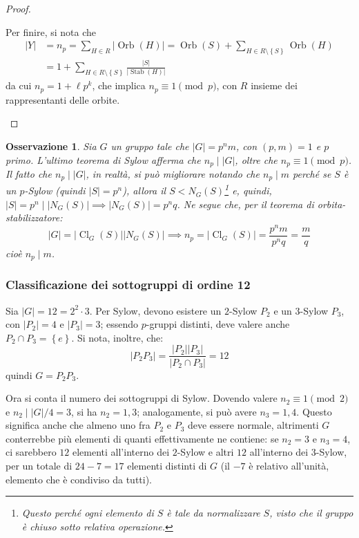 \documentclass[12pt]{scrartcl}
\theoremstyle{style}
\newtheorem{osservazione}{Osservazione}[section]
\numberwithin{equation}{subsection}
\begin{document}
\begin{proof}
\begin{enumerate}[(a).]
				Per finire, si nota che
				\[
					\begin{split}
						\lvert Y \rvert &=n_p = \sum_{H \in R}^{} \lvert \operatorname{Orb} (H) \rvert = \operatorname{Orb} (S) + \sum_{H \in R \setminus\left\{ S \right\} }^{} \operatorname{Orb} (H) \\
								&= 1 + \sum_{H \in R \setminus\left\{ S \right\} }^{} \frac{\lvert S \rvert }{\lvert \operatorname{Stab} (H) \rvert }
					\end{split}
				\] 
				da cui $n_p = 1 + \ell p^k$, che implica $n_p \equiv 1 \pmod{p} $, con $R$ insieme dei rappresentanti delle orbite.
		\end{enumerate}
	\end{proof}
\begin{osservazione}
Sia $G$ un gruppo tale che $\lvert G \rvert =p^n m $, con $(p,m)= 1$ e $p$ primo. L'ultimo teorema di Sylow afferma che $n_p  \mid \lvert G \rvert$, oltre che $n_p \equiv 1 \pmod{p} $.
Il fatto che $n_p  \mid |G|$, in realt\`a, si pu\`o migliorare notando che $n_p  \mid  m$ perch\'e se $S$ \`e un $p$-Sylow (quindi $\lvert S \rvert =p^n$), allora il $S < N_G(S)$\footnote{Questo perch\'e ogni elemento di $S$ \`e tale da normalizzare $S$, visto che il gruppo \`e chiuso sotto relativa operazione.} e, quindi, $\lvert S \rvert = p^n  \mid \lvert N_G(S) \rvert \implies \lvert N_G(S) \rvert = p^n q$.
Ne segue che, per il teorema di orbita-stabilizzatore:
\[
\lvert G \rvert  = \lvert \operatorname{Cl} _G(S)  \rvert \lvert N_G(S) \rvert \implies n_p = \lvert \operatorname{Cl} _G(S) \rvert = \frac{p^n m}{p^n q} = \frac{m}{q}
\] 
cio\`e $n_p  \mid m$.
\end{osservazione}
\subsubsection{Classificazione dei sottogruppi di ordine 12}
	Sia $\lvert G \rvert = 12 = 2^2 \cdot 3$. 
	Per Sylow, devono esistere un $2$-Sylow $P_2$ e un $3$-Sylow $P_3$, con $\lvert P_2 \rvert =4$ e $\lvert P_3 \rvert =3$; essendo $p$-gruppi distinti, deve valere anche $P_2\cap P_3 = \left\{ e \right\} $.
	Si nota, inoltre, che:
	\[
	\lvert P_2P_3 \rvert = \frac{\lvert P_2 \rvert \lvert P_3 \rvert }{\lvert P_2 \cap P_3\rvert} = 12
	\] 
	quindi $G = P_2P_3$.
	
	Ora si conta il numero dei sottogruppi di Sylow.
	Dovendo valere $n_2\equiv 1 \pmod{2} $ e $n_2  \mid |G| / 4 = 3$, si ha $n_2 = 1, 3$; analogamente, si pu\`o avere $n_3 = 1,4$.
	Questo significa anche che almeno uno fra $P_2$ e $ P_3$ deve essere normale, altrimenti $G$ conterrebbe pi\`u elementi di quanti effettivamente ne contiene: se $n_2 = 3$ e $n_3=4$, ci sarebbero $12$ elementi all'interno dei $2$-Sylow e altri $12$ all'interno dei $3$-Sylow, per un totale di $24-7 = 17$ elementi distinti di $G$ (il $-7$ \`e relativo all'unit\`a, elemento che \`e condiviso da tutti).
\end{document}
